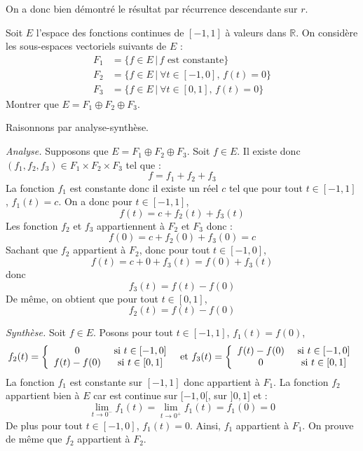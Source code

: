 \documentclass[a4paper,10pt]{report}
\begin{document}
\medskip

\noindent On a donc bien démontré le résultat par récurrence descendante sur $r$.

\begin{Exercice}{} Soit $E$ l'espace des fonctions continues de $[-1,1]$ à valeurs dans $\mathbb{R}$. On considère les sous-espaces vectoriels suivants de $E$ :
\begin{align*}
F_1 &= \lbrace f \in E \, \vert \, f{\text{~est constante}} \rbrace \\
F_2 &= \lbrace f \in E \, \vert \ \forall t \in [ - 1,0], \,  f(t)  = 0 \rbrace \\
F_3 & = \lbrace f \in E \, \vert \ \forall t \in [0,1], \,  f(t) = 0 \rbrace 
\end{align*}
Montrer que $E = F_1 \oplus F_2 \oplus F_3$.
\end{Exercice} 


\corr Raisonnons par analyse-synthèse.

\medskip

\noindent \textit{Analyse.} Supposons que $E = F_1 \oplus F_2 \oplus F_3$. Soit $f \in E$. Il existe donc $(f_1,f_2,f_3) \in F_1 \times F_2 \times F_3$ tel que :
$$ f = f_1+ f_2+ f_3$$
La fonction $f_1$ est constante donc il existe un réel $c$ tel que pour tout $t \in [-1,1]$, $f_1(t)=c$. On a donc pour $t \in [-1,1]$,
$$ f(t) = c + f_2(t) + f_3(t)$$
Les fonction $f_2$ et $f_3$ appartiennent à $F_2$ et $F_3$ donc :
$$ f(0) = c + f_2(0)+ f_3(0) = c$$
Sachant que $f_2$ appartient à $F_2$, donc pour tout $t \in [-1,0]$,
$$f(t) = c + 0 + f_3(t) = f(0)+ f_3(t)$$
donc 
$$ f_3(t) = f(t)- f(0)$$
De même, on obtient que pour tout $t \in [0,1]$,
$$ f_2(t) = f(t)-f(0)$$

\medskip

\noindent \textit{Synthèse.} Soit $f \in E$. Posons pour tout $t \in [-1,1]$, $f_1(t) = f(0)$, 
$$ f_2(t) = \left\lbrace \begin{array}{ccl}
0 & \hbox{ si } t \in [-1,0] \\
f(t)-f(0) & \hbox{ si } t \in [0,1]
\end{array}\right. \; \hbox{ et } f_3(t) = \left\lbrace \begin{array}{ccl}
f(t)-f(0) & \hbox{ si } t \in [-1,0] \\
0 & \hbox{ si } t \in [0,1]
\end{array}\right.$$
La fonction $f_1$ est constante sur $[-1,1]$ donc appartient à $F_1$. La fonction $f_2$ appartient bien à $E$ car est continue sur $[-1,0[$, sur $]0,1]$ et :
$$ \lim_{t \rightarrow 0^{-}} f_1(t) =  \lim_{t \rightarrow 0^{+}} f_1(t) = f_1(0) = 0$$
De plus pour tout $t \in [-1,0]$, $f_1(t)=0$. Ainsi, $f_1$ appartient à $F_1$. On prouve de même que $f_2$ appartient à $F_2$. 
\end{document}
